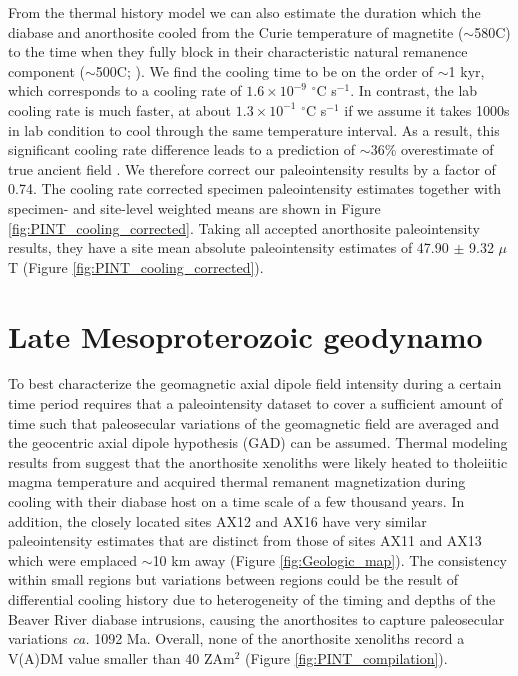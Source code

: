 \documentclass[9pt,twocolumn,twoside,lineno]{pnas-new}
\begin{document}
From the thermal history model we can also estimate the duration which the diabase and anorthosite cooled from the Curie temperature of magnetite ($\sim$580\textdegree C) to the time when they fully block in their characteristic natural remanence component ($\sim$500\textdegree C; ). We find the cooling time to be on the order of $\sim$1 kyr, which corresponds to a cooling rate of $1.6\times10^{-9}$ $^\circ$C s$^{-1}$. In contrast, the lab cooling rate is much faster, at about $1.3\times10^{-1}$ $^\circ$C s$^{-1}$ if we assume it takes 1000s in lab condition to cool through the same temperature interval. As a result, this significant cooling rate difference leads to a prediction of $\sim$36\% overestimate of true ancient field \cite{Halgedahl1980a}. We therefore correct our paleointensity results by a factor of 0.74. The cooling rate corrected specimen paleointensity estimates together with specimen- and site-level weighted means are shown in Figure \ref{fig:PINT_cooling_corrected}. Taking all accepted anorthosite paleointensity results, they have a site mean absolute paleointensity estimates of 47.90 $\pm$ 9.32 $\mu$T (Figure \ref{fig:PINT_cooling_corrected}). 

\section*{Late Mesoproterozoic geodynamo }
To best characterize the geomagnetic axial dipole field intensity during a certain time period requires that a paleointensity dataset to cover a sufficient amount of time such that paleosecular variations of the geomagnetic field are averaged and the geocentric axial dipole hypothesis (GAD) can be assumed. Thermal modeling results from  suggest that the anorthosite xenoliths were likely heated to tholeiitic magma temperature and acquired thermal remanent magnetization during cooling with their diabase host on a time scale of a few thousand years. In addition, the closely located sites AX12 and AX16 have very similar paleointensity estimates that are distinct from those of sites AX11 and AX13 which were emplaced $\sim$10 km away (Figure \ref{fig:Geologic_map}). The consistency within small regions but variations between regions could be the result of differential cooling history due to heterogeneity of the timing and depths of the Beaver River diabase intrusions, causing the anorthosites to capture paleosecular variations \textit{ca.} 1092 Ma. Overall, none of the anorthosite xenoliths record a V(A)DM value smaller than 40 ZAm$^2$ (Figure \ref{fig:PINT_compilation}). 
\end{document}
